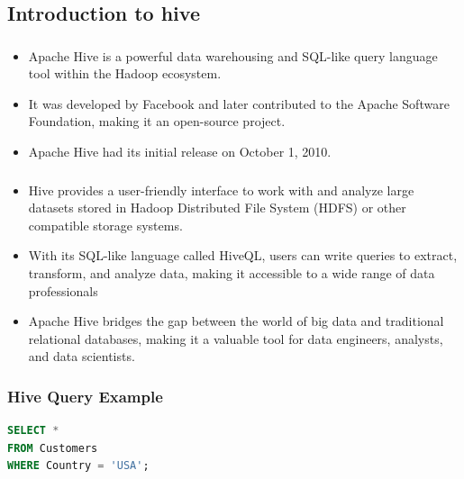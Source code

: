 \subsection{Introduction to hive}
\begin{frame}
\frametitle{\subsecname}
\begin{itemize} 
	\item Apache Hive is a powerful data warehousing and SQL-like query language tool within the Hadoop ecosystem.\pause
	\item It was developed by Facebook and later contributed to the Apache Software Foundation, making it an open-source project.\pause
	\item Apache Hive had its initial release on October 1, 2010.	\pause
\end{itemize}
\end{frame}

\begin{frame}
	\frametitle{\subsecname}
	\begin{itemize} 
		\item Hive provides a user-friendly interface to work with and analyze large datasets stored in Hadoop Distributed File System (HDFS) or other compatible storage systems.\pause
		\item With its SQL-like language called HiveQL, users can write queries to extract, transform, and analyze data, making it accessible to a wide range of data professionals\pause
		\item Apache Hive bridges the gap between the world of big data and traditional relational databases, making it a valuable tool for data engineers, analysts, and data scientists.\pause	
	\end{itemize}
	\end{frame}

	\begin{frame}[fragile]
		\frametitle{Hive Query Example}

\begin{lstlisting}[caption={Hive Query Example},language=SQL]
SELECT * 
FROM Customers
WHERE Country = 'USA';
\end{lstlisting}

	\end{frame}


